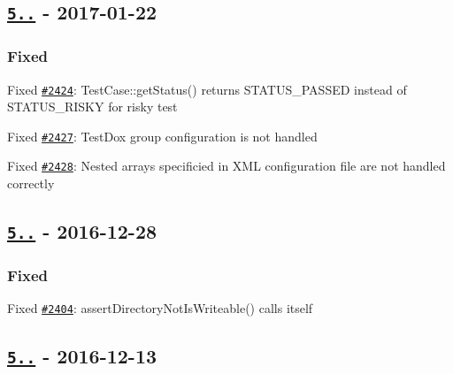 \subsection*{\href{https://github.com/sebastianbergmann/phpunit/compare/5.7.5...5.7.6}{\tt 5..} -\/ 2017-\/01-\/22}

\subsubsection*{Fixed}


\begin{DoxyItemize}
\item Fixed \href{https://github.com/sebastianbergmann/phpunit/issues/2424}{\tt \#2424}\+: {\ttfamily Test\+Case\+::get\+Status()} returns {\ttfamily S\+T\+A\+T\+U\+S\+\_\+\+P\+A\+S\+S\+ED} instead of {\ttfamily S\+T\+A\+T\+U\+S\+\_\+\+R\+I\+S\+KY} for risky test
\item Fixed \href{https://github.com/sebastianbergmann/phpunit/issues/2427}{\tt \#2427}\+: Test\+Dox group configuration is not handled
\item Fixed \href{https://github.com/sebastianbergmann/phpunit/pull/2428}{\tt \#2428}\+: Nested arrays specificied in X\+ML configuration file are not handled correctly
\end{DoxyItemize}

\subsection*{\href{https://github.com/sebastianbergmann/phpunit/compare/5.7.4...5.7.5}{\tt 5..} -\/ 2016-\/12-\/28}

\subsubsection*{Fixed}


\begin{DoxyItemize}
\item Fixed \href{https://github.com/sebastianbergmann/phpunit/pull/2404}{\tt \#2404}\+: {\ttfamily assert\+Directory\+Not\+Is\+Writeable()} calls itself
\end{DoxyItemize}

\subsection*{\href{https://github.com/sebastianbergmann/phpunit/compare/5.7.3...5.7.4}{\tt 5..} -\/ 2016-\/12-\/13}

